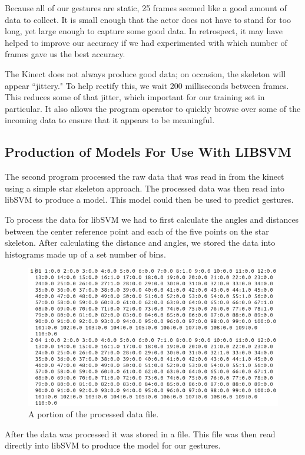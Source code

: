 \documentclass[11pt,conference]{IEEEtran}
\begin{document}
Because all of our gestures are static, 25 frames seemed like a good amount of data to collect. It is small enough that the actor does not have to stand for too long, yet large enough to capture some good data. In retrospect, it may have helped to improve our accuracy if we had experimented with which number of frames gave us the best accuracy.

The Kinect does not always produce good data; on occasion, the skeleton will appear ``jittery." To help rectify this, we wait 200 milliseconds between frames. This reduces some of that jitter, which important for our training set in particular. It also allows the program operator to quickly browse over some of the incoming data to ensure that it appears to be meaningful.

\subsection{Production of Models For Use With LIBSVM}
The second program processed the raw data that was read in from the kinect using a simple star skeleton approach. The processed data was then read into libSVM to produce a model. This model could then be used to predict gestures.

To process the data for libSVM we had to first calculate the angles and distances between the center reference point and each of the five points on the star skeleton. After calculating the distance and angles, we stored the data into histograms made up of a set number of bins.

\begin{figure}[h]
\caption{A portion of the processed data file.}
\centering
\includegraphics[width=\linewidth]{processed_data}
\end{figure}

After the data was processed it was stored in a file. This file was then read directly into libSVM to produce the model for our gestures. 
\end{document}

